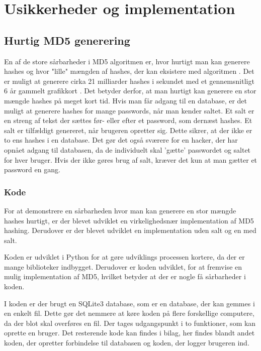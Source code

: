 \documentclass[12pt]{article}
\begin{document}
\section{Usikkerheder og implementation}
\subsection{Hurtig MD5 generering}
En af de store sårbarheder i MD5 algoritmen er, hvor hurtigt man kan generere hashes og hvor "lille" mængden af hashes, der kan eksistere med algoritmen \cite{ntantogian_evaluation_2019}. Det er muligt at generere cirka 21 milliarder hashes i sekundet med et gennemsnitligt 6 år gammelt grafikkort \cite{ntantogian_evaluation_2019}. Det betyder derfor, at man hurtigt kan generere en stor mængde hashes på meget kort tid. Hvis man får adgang til en database, er det muligt at generere hashes for mange passwords, når man kender saltet. Et salt er en streng af tekst der sættes før- eller efter et password, som dernæst hashes. Et salt er tilfældigt genereret, når brugeren opretter sig. Dette sikrer, at der ikke er to ens hashes i en database. Det gør det også sværere for en hacker, der har opnået adgang til databasen, da de individuelt skal 'gætte' passwordet og saltet for hver bruger. Hvis der ikke gøres brug af salt, kræver det kun at man gætter et password en gang. 

\subsubsection{Kode}
For at demonstrere en sårbarheden hvor man kan generere en stor mængde hashes hurtigt, er der blevet udviklet en virkelighedsnær implementation af MD5 hashing. Derudover er der blevet udviklet en implementation uden salt og en med salt. 

Koden er udviklet i Python for at gøre udviklings processen kortere, da der er mange biblioteker indbygget. Derudover er koden udviklet, for at fremvise en mulig implementation af MD5, hvilket betyder at der er nogle få sårbarheder i koden. 

I koden er der brugt en SQLite3 database, som er en database, der kan gemmes i en enkelt fil. Dette gør det nemmere at køre koden på flere forskellige computere, da der blot skal overføres en fil. Der tages udgangspunkt i to funktioner, som kan oprette en bruger. Det resterende kode kan findes i bilag, her findes blandt andet koden, der opretter forbindelse til databasen og koden, der logger brugeren ind. 
\end{document}

